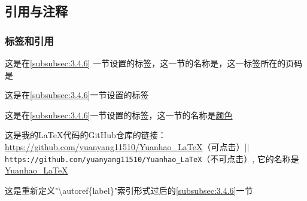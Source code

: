\documentclass{ctexart}
\begin{document}
    \subsection{引用与注释}
        \subsubsection{标签和引用}
            这是在\ref{subsubsec:3.4.6} 一节设置的标签，这一节的名称是，这一标签所在的页码是\pageref{subsubsec:3.4.6}
            
            这是在\eqref{subsubsec:3.4.6}一节设置的标签

            这是在\autoref{subsubsec:3.4.6}一节设置的标签，这一节的名称是\hyperref[subsubsec:3.4.6]{颜色}

            这是我的\LaTeX 代码的GitHub仓库的链接：\url{https://github.com/yuanyang11510/Yuanhao_LaTeX}（可点击）|| %
            \nolinkurl{https://github.com/yuanyang11510/Yuanhao_LaTeX}（不可点击）, %
            它的名称是\href{https://github.com/yuanyang11510/Yuanhao_LaTeX}{Yuanhao\_LaTeX} 

            \renewcommand*{\subsubsectionautorefname}{小节标题}
            这是重新定义"\textbackslash autoref\{label\}"索引形式过后的\autoref{subsubsec:3.4.6}一节
        
\end{document}
